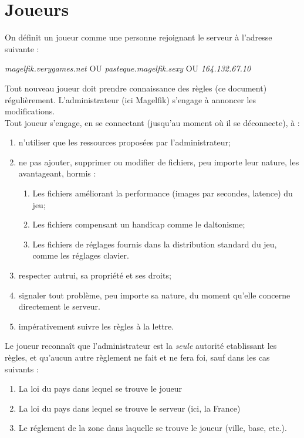 \section{Joueurs}
\begin{flushleft}
	On d\'efinit un joueur comme une personne rejoignant le serveur \`a l'adresse suivante :
	\begin{center}
		\textit{magelfik.verygames.net}
		OU
		\textit{pasteque.magelfik.sexy}
		OU
		\textit{164.132.67.10}
	\end{center}
	Tout nouveau joueur doit prendre connaissance des r\`egles (ce document) r\'eguli\`erement. L'administrateur (ici Magelfik) s'engage \`a annoncer les modifications. \\
	Tout joueur s'engage, en se connectant (jusqu'au moment o\`u il se d\'econnecte), \`a :
	\begin{enumerate}
		\item n'utiliser que les ressources propos\'ees par l'administrateur;
		\item ne pas ajouter, supprimer ou modifier de fichiers, peu importe leur nature, les avantageant, hormis :
		\begin{enumerate}
			\item Les fichiers am\'eliorant la performance (images par secondes, latence) du jeu;
			\item Les fichiers compensant un handicap comme le daltonisme;
			\item Les fichiers de r\'eglages fournis dans la distribution standard du jeu, comme les r\'eglages clavier.
		\end{enumerate}
		\item respecter autrui, sa propri\'et\'e et ses droits;
		\item signaler tout probl\`eme, peu importe sa nature, du moment qu'elle concerne directement le serveur.
		\item imp\'erativement suivre les r\`egles \`a la lettre.
	\end{enumerate}
	Le joueur reconna\^it que l'administrateur est la \textit{seule} autorit\'e etablissant les r\`egles, et qu'aucun autre r\`eglement ne fait et ne fera foi, sauf dans les cas suivants :
	\begin{enumerate}
		\item La loi du pays dans lequel se trouve le joueur
		\item La loi du pays dans lequel se trouve le serveur (ici, la France)
		\item Le r\'eglement de la zone dans laquelle se trouve le joueur (ville, base, etc.).

\end{enumerate}
\end{flushleft}
